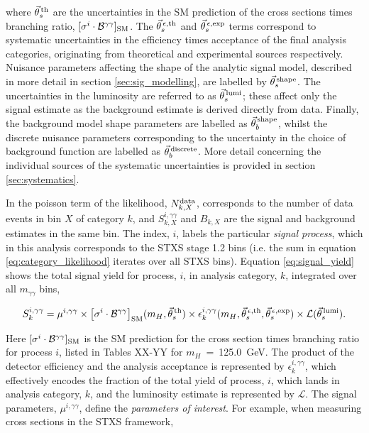 \noindent
where $\vec{\theta}^{\,\rm{th}}_{s}$ are the uncertainties in the SM prediction of the cross sections times branching ratio, $[\sigma^i \cdot \mathcal{B}^{\gamma\gamma}]_{\rm{SM}}$. The $\vec{\theta}^{\,\epsilon,{\rm{th}}}_{s}$ and $\vec{\theta}^{\,\epsilon,{\rm{exp}}}_{s}$ terms correspond to systematic uncertainties in the efficiency times acceptance of the final analysis categories, originating from theoretical and experimental sources respectively. Nuisance parameters affecting the shape of the analytic signal model, described in more detail in section \ref{sec:sig_modelling}, are labelled by $\vec{\theta}^{\,\rm{shape}}_{s}$. The uncertainties in the luminosity are referred to as $\vec{\theta}^{\,\rm{lumi}}_{s}$; these affect only the signal estimate as the background estimate is derived directly from data. Finally, the background model shape parameters are labelled as $\vec{\theta}^{\,\rm{shape}}_{b}$, whilst the discrete nuisance parameters corresponding to the uncertainty in the choice of background function are labelled as $\vec{\theta}^{\,\rm{discrete}}_{b}$. More detail concerning the individual sources of the systematic uncertainties is provided in section \ref{sec:systematics}.

In the poisson term of the likelihood, $N_{k,X}^{\rm{data}}$, corresponds to the number of data events in bin $X$ of category $k$, and $S_{k,X}^{i,\gamma\gamma}$ and $B_{k,X}$ are the signal and background estimates in the same bin. The index, $i$, labels the particular \textit{signal process}, which in this analysis corresponds to the STXS stage 1.2 bins (i.e. the sum in equation \ref{eq:category_likelihood} iterates over all STXS bins). Equation \ref{eq:signal_yield} shows the total signal yield for process, $i$, in analysis category, $k$, integrated over all $m_{\gamma\gamma}$ bins,

\begin{equation}\label{eq:signal_yield}
    S_k^{i,\gamma\gamma} = \mu^{i,\gamma\gamma} \times \big[\sigma^i \cdot \mathcal{B}^{\gamma\gamma} \big]_{\rm{SM}}(m_H,\vec{\theta}^{\,\rm{th}}_{s}) \times \epsilon^{i,\gamma\gamma}_k(m_H,\vec{\theta}^{\,\epsilon,{\rm{th}}}_{s}, \vec{\theta}^{\,\epsilon,{\rm{exp}}}_{s}) \times \mathcal{L}(\vec{\theta}^{\,\rm{lumi}}_{s}).
\end{equation}

\noindent
Here $[\sigma^i \cdot \mathcal{B}^{\gamma\gamma}]_{\rm{SM}}$ is the SM prediction for the cross section times branching ratio for process $i$, listed in Tables XX-YY for $m_H$~=~125.0~GeV. The product of the detector efficiency and the analysis acceptance is represented by $\epsilon^{i,\gamma\gamma}_k$, which effectively encodes the fraction of the total yield of process, $i$, which lands in analysis category, $k$, and the luminosity estimate is represented by $\mathcal{L}$. The signal parameters, $\mu^{i,\gamma\gamma}$, define the \textit{parameters of interest}. For example, when measuring cross sections in the STXS framework,

